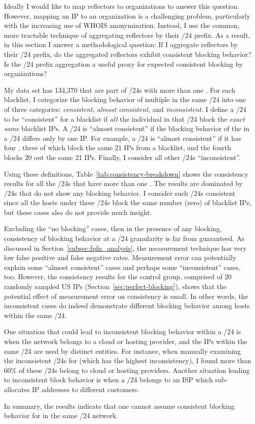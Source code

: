 Ideally I would like to map reflectors to organizations to answer
this question.  However, mapping an IP to an organization is a
challenging problem, particularly with the increasing use of WHOIS
anonymization.  Instead, I use the common, more tractable technique
of aggregating reflectors by their /24 prefix.  As a result, in this
section I answer a methodological question: If I aggregate
reflectors by their /24 prefix, do the aggregated reflectors exhibit
consistent blocking behavior?  Is the /24 prefix aggregation a useful
proxy for expected consistent blocking by organizations?

My data set has 134,370 {} that are part of /24s with more
than one {}.  For each blacklist, I categorize the blocking
behavior of multiple {} in the same /24 into one of three
categories: \textit{consistent}, \textit{almost consistent}, and
\textit{inconsistent}.  I define a /24 to be ``consistent'' for a
blacklist if \textit{all} the individual {} in that /24
block the \textit{exact same} blacklist IPs.
%
A /24 is ``almost consistent'' if the blocking behavior of the
{} in a /24 differs only by one IP. For example, a /24 is
``almost consistent'' if it has four {}, three of which
block the same 21 IPs from a blacklist, and the fourth {}
blocks 20 out the same 21 IPs.
Finally, I consider all other /24s ``inconsistent''.


Using these definitions, Table~\ref{tab:consistency-breakdown} shows
the consistency results for all the /24s that have more than one
{}. The results are dominated by /24s that do not show any
blocking behavior.  I consider such /24s consistent since all the
hosts under these /24s block the same number (zero) of blacklist IPs,
but these cases also do not provide much insight.

Excluding the ``no blocking'' cases, then in the presence of any
blocking, consistency of blocking behavior at a /24 granularity is far
from guaranteed.  As discussed in Section~\ref{subsec:fpfn_analysis},
the measurement technique has very low false positive and false
negative rates.  Measurement error can potentially explain some
``almost consistent'' cases and perhaps some ``inconsistent'' cases,
too.  However, the consistency results for the control group,
comprised of 20 randomly sampled US IPs
(Section~\ref{sec:perfect-blocking}), shows that the potential effect
of measurement error on consistency is small.  In other words, the
inconsistent cases do indeed demonstrate different blocking behavior
among hosts within the same /24.

One situation that could lead to inconsistent blocking behavior within
a /24 is when the network belongs to a cloud or hosting provider, and
the IPs within the same /24 are used by distinct entities.  For
instance, when manually examining the inconsistent /24s for {\bdsatif}
(which has the highest inconsistency), I found more than 60\% of
these /24s belong to cloud or hosting providers.  Another situation
leading to inconsistent block behavior is when a /24 belongs to an ISP
which sub-allocates IP addresses to different customers.

In summary, the results indicate that one cannot assume consistent
blocking behavior for {} in the same /24 network.
